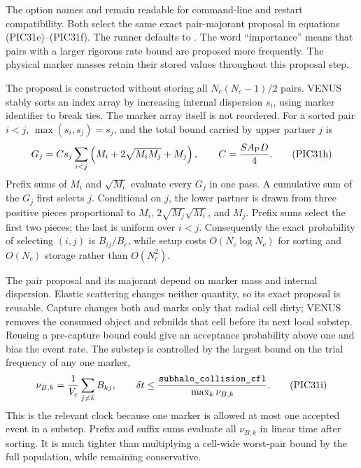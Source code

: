 The option names  and
 remain readable for command-line and restart
compatibility.  Both select the same exact pair-majorant proposal in
equations (PIC31e)--(PIC31f).  The runner defaults to
.  The word ``importance'' means that pairs with a larger rigorous rate bound
are proposed more frequently.  The physical marker masses retain their
stored values throughout this proposal step.

The proposal is constructed without storing all \(N_c(N_c-1)/2\) pairs.
VENUS stably sorts an index array by increasing internal dispersion \(s_i\),
using marker identifier to break ties.  The marker array itself is not
reordered.  For a sorted pair \(i<j\), \(\max(s_i,s_j)=s_j\), and the total
bound carried by upper partner \(j\) is
\[
 G_j=C s_j\sum_{i<j}
 \left(M_i+2\sqrt{M_iM_j}+M_j\right),\qquad
 C=\frac{S A_{\rm P}D}{4}.                                \tag{PIC31h}
\]
Prefix sums of \(M_i\) and \(\sqrt{M_i}\) evaluate every \(G_j\) in one pass.
A cumulative sum of the \(G_j\) first selects \(j\).  Conditional on \(j\),
the lower partner is drawn from three positive pieces proportional to
\(M_i\), \(2\sqrt{M_j}\sqrt{M_i}\), and \(M_j\).  Prefix sums select the first
two pieces; the last is uniform over \(i<j\).  Consequently the exact
probability of selecting \((i,j)\) is \(B_{ij}/B_c\), while setup costs
\(O(N_c\log N_c)\) for sorting and \(O(N_c)\) storage rather than
\(O(N_c^2)\).

The pair proposal and its majorant depend on marker mass and internal
dispersion.  Elastic scattering changes neither quantity, so its exact
proposal is reusable.  Capture changes both and marks only that radial cell
dirty; VENUS removes the consumed object and rebuilds that cell before its
next local substep.  Reusing a pre-capture bound could give an acceptance
probability above one and bias the event rate.  The substep is controlled by
the largest bound on the trial frequency
of any one marker,
\[
 \nu_{B,k}=\frac{1}{V_c}\sum_{j\ne k}B_{kj},\qquad
 \delta t\le
 \frac{\code{subhalo_collision_cfl}}{\max_k\nu_{B,k}}.   \tag{PIC31i}
\]
This is the relevant clock because one marker is allowed at most one accepted
event in a substep.  Prefix and suffix sums evaluate all \(\nu_{B,k}\) in
linear time after sorting.  It is much tighter than multiplying a cell-wide
worst-pair bound by the full population, while remaining conservative.

